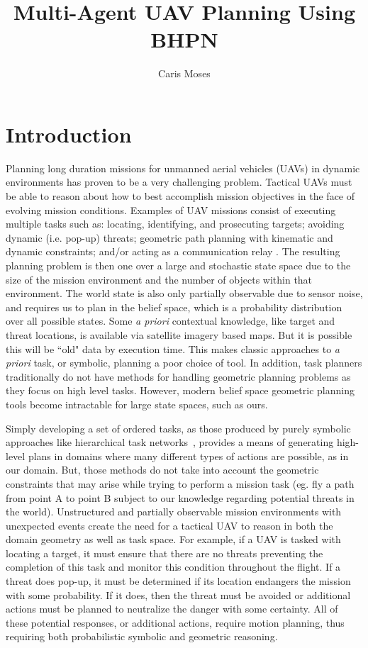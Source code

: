 \documentclass[12pt]{article}
\author{Caris Moses}
\title{Multi-Agent UAV Planning Using BHPN}
\date{\vspace{-5ex}}
\begin{document}
\maketitle

\tableofcontents

\section{Introduction}

Planning long duration missions for unmanned aerial vehicles (UAVs) in dynamic environments has proven to be a very challenging problem. Tactical UAVs must be able to reason about how to best accomplish mission objectives in the face of evolving mission conditions. Examples of UAV missions consist of executing multiple tasks such as: locating, identifying, and prosecuting targets; avoiding dynamic (i.e. pop-up) threats; geometric path planning with kinematic and dynamic constraints; and/or acting as a communication relay \cite{cambone2005unmanned}. The resulting planning problem is then one over a large and stochastic state space due to the size of the mission environment and the number of objects within that environment. The world state is also only partially observable due to sensor noise, and requires us to plan in the belief space, which is a probability distribution over all possible states. Some \textit{a priori} contextual knowledge, like target and threat locations, is available via satellite imagery based maps. But it is possible this will be ``old" data by execution time. This makes classic approaches to \textit{a priori} task, or symbolic, planning a poor choice of tool. In addition, task planners traditionally do not have methods for handling geometric planning problems as they focus on high level tasks. However, modern belief space geometric planning tools become intractable for large state spaces, such as ours.

Simply developing a set of ordered tasks, as those produced by purely symbolic approaches like hierarchical task networks~\cite{erol1994htn}, provides a means of generating high-level plans in domains where many different types of actions are possible, as in our domain. But, those methods do not take into account the geometric constraints that may arise while trying to perform a mission task (eg. fly a path from point A to point B subject to our knowledge regarding potential threats in the world). Unstructured and partially observable mission environments with unexpected events create the need for a tactical UAV to reason in both the domain geometry as well as task space. For example, if a UAV is tasked with locating a target, it must ensure that there are no threats preventing the completion of this task and monitor this condition throughout the flight. If a threat does pop-up, it must be determined if its location endangers the mission with some probability. If it does, then the threat must be avoided or additional actions must be planned to neutralize the danger with some certainty. All of these potential responses, or additional actions, require motion planning, thus requiring both probabilistic symbolic and geometric reasoning. 
\end{document}

